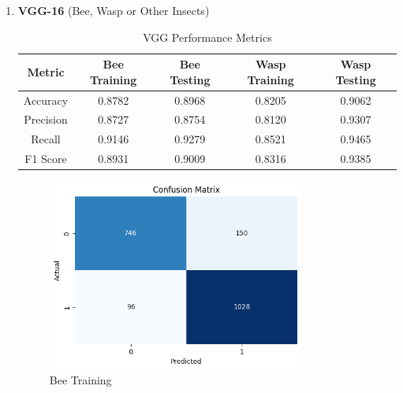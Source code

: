 \documentclass[12pt]{article}
\begin{document}
	\newpage
	\begin{enumerate}
		
		\item \textbf{VGG-16} (Bee, Wasp or Other Insects) \\
		\begin{table}[H]
			\centering
			\caption{VGG Performance Metrics}
			\vspace{0.25 cm}
			\begin{tabular}{|c|c|c|c|c|}
				\hline
				\textbf{Metric} & \textbf{Bee Training} & \textbf{Bee Testing}  & \textbf{Wasp Training} & \textbf{Wasp Testing}\\
				\hline
				Accuracy & 0.8782  & 0.8968 & 0.8205  & 0.9062 \\ \hline
				Precision & 0.8727 & 0.8754  & 0.8120 & 0.9307\\ \hline
				Recall & 0.9146 & 0.9279  & 0.8521 & 0.9465 \\ \hline
				F1 Score & 0.8931 & 0.9009 & 0.8316 & 0.9385 \\ \hline
			\end{tabular}
			\label{tab:VGG_METRICS}
		\end{table}
		\begin{figure}[H]
			\centering
			\vspace{1 cm}
			\begin{minipage}{0.45\textwidth}
				\centering
				\includegraphics[width=0.8\textwidth]{Images/Confusion/vgg bees train.png}\\ \vspace{0.25 cm}
				Bee Training
			\end{minipage}
			\hfill
			\begin{minipage}{0.45\textwidth} 
				\centering           

\end{minipage}
\end{figure}
\end{enumerate}
\end{document}
